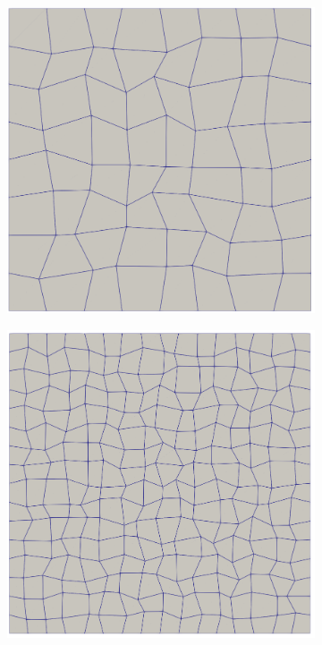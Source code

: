\documentclass{ansarticle-preprint}
\begin{document}
\begin{figure}
  \centering
  \begin{subfigure}[b]{0.28\textwidth}
    \centering
    \includegraphics[width=\textwidth]{png/mesh_0.png}
  \end{subfigure}\qquad
  \hfill
  \begin{subfigure}[b]{0.28\textwidth}
    \centering
    \includegraphics[width=\textwidth]{png/mesh_1.png}

\end{subfigure}
\end{figure}
\end{document}
